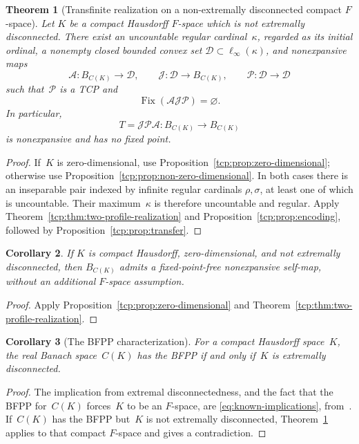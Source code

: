 \documentclass[preprint,12pt,nopreprintline]{elsarticle}
\newtheorem{theorem}{Theorem}[section]
\newtheorem{corollary}[theorem]{Corollary}
\theoremstyle{definition}
\theoremstyle{remark}
\numberwithin{equation}{section}
\begin{document}
\begin{theorem}[Transfinite realization on a non-extremally disconnected
compact $F$-space]
\label{tcp:thm:main}
Let $K$ be a compact Hausdorff $F$-space which is not extremally disconnected. There exist an uncountable regular cardinal~$\kappa$, regarded as its initial ordinal, a nonempty closed bounded convex set $\mathcal D\subset\ell_\infty(\kappa)$, and nonexpansive maps
\[
 \mathcal A:B_{C(K)}\longrightarrow\mathcal D,
 \qquad
 \mathcal J:\mathcal D\longrightarrow B_{C(K)},
 \qquad
 \mathscr P:\mathcal D\longrightarrow\mathcal D
\]
such that~$\mathscr P$ is a TCP and
\[
 \operatorname{Fix}(\mathcal A\mathcal J\mathscr P)=\varnothing.
\]
In particular,
\[
 T=\mathcal J\mathscr P\mathcal A:
 B_{C(K)}\longrightarrow B_{C(K)}
\]
is nonexpansive and has no fixed point.
\end{theorem}

\begin{proof}
If~$K$ is zero-dimensional, use Proposition~\ref{tcp:prop:zero-dimensional}; otherwise use Proposition~\ref{tcp:prop:non-zero-dimensional}. In both cases there is an inseparable pair indexed by infinite regular cardinals $\rho,\sigma$, at least one of which is uncountable. Their maximum~$\kappa$ is therefore uncountable and regular. Apply Theorem~\ref{tcp:thm:two-profile-realization} and Proposition~\ref{tcp:prop:encoding}, followed by Proposition~\ref{tcp:prop:transfer}.
\end{proof}

\begin{corollary}
\label{tcp:cor:zero-dimensional}
If $K$ is compact Hausdorff, zero-dimensional, and not extremally disconnected, then $B_{C(K)}$ admits a fixed-point-free nonexpansive self-map, without an additional $F$-space assumption.
\end{corollary}

\begin{proof}
Apply Proposition~\ref{tcp:prop:zero-dimensional} and Theorem~\ref{tcp:thm:two-profile-realization}.
\end{proof}

\begin{corollary}[The BFPP characterization]
\label{tcp:cor:characterization}
For a compact Hausdorff space~$K$, the real Banach space~$C(K)$ has the BFPP if and only if~$K$ is extremally disconnected.
\end{corollary}

\begin{proof}
The implication from extremal disconnectedness, and the fact that the BFPP for~$C(K)$ forces~$K$ to be an $F$-space, are \eqref{eq:known-implications}, from~\cite[Corollary~2.4 and Theorem~3.2]{AJLCS}. If~$C(K)$ has the BFPP but~$K$ is not extremally disconnected,
Theorem~\ref{tcp:thm:main} applies to that compact $F$-space and gives a contradiction.
\end{proof}
\end{document}
